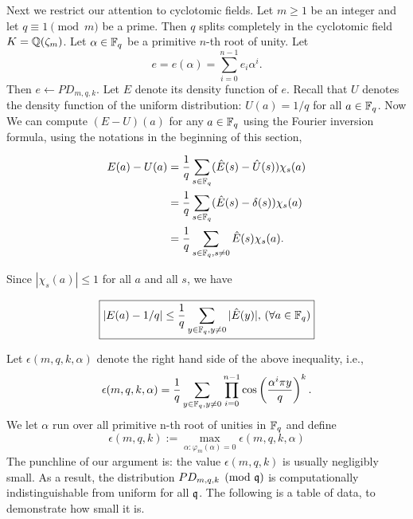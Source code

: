\documentclass{amsart}
\begin{document}
Next we restrict our attention to cyclotomic fields. Let
$m \geq 1$ be an integer and let $q \equiv 1 \pmod{m}$ be a prime. Then $q$ splits completely in the cyclotomic field $K = \mathbb{Q}(\zeta_m)$. Let $\alpha \in \mathbb{F}_q$ be a primitive $n$-th root of unity. Let
\[
    e = e(\alpha) = \sum_{i=0}^{n-1} e_i \alpha^i.
\]
Then $e \gets PD_{m,q,k}$. Let $E$ denote its density function of $e$. Recall that $U$ denotes the density function of the uniform distribution: $U(a) = 1/q$ for all $a \in \mathbb{F}_q$. Now We can compute $(E - U)(a)$ for any $a \in \mathbb{F}_q$ using the Fourier inversion formula, using the notations in the beginning of this section,

\begin{align*}
    E(a) - U(a) &= \frac{1}{q} \sum_{s \in \mathbb{F}_q} (\hat{E}(s) - \hat{U}(s) )\chi_s(a) \\
& = \frac{1}{q} \sum_{s \in \mathbb{F}_q} (\hat{E}(s) - \delta(s) )\chi_s(a) \\
& = \frac{1}{q} \sum_{s \in \mathbb{F}_q, s \neq 0} \hat{E}(s) \chi_s(a).
\end{align*}

Since $|\chi_s(a)| \leq 1$ for all $a$ and all $s$, we have

\begin{Prop}
\[
    \boxed{|E(a) -  1/q| \leq \frac{1}{q}  \sum_{y \in \mathbb{F}_q, y \neq 0}  |\hat{E}(y)|, \, (\forall a \in \mathbb{F}_q)}
\]
\end{Prop}

Let $\epsilon(m,q,k,\alpha)$ denote the right hand side of the above inequality, i.e.,
\[
    \epsilon(m,q,k, \alpha) = \frac{1}{q}\sum_{y \in \mathbb{F}_q, y \neq 0} \prod_{i=0}^{n-1} \cos \left(\frac{ \alpha^i \pi y}{q} \right)^k.
\]
We let $\alpha$ run over all primitive n-th root of unities in $\mathbb{F}_q$ and define
$$\epsilon(m,q,k) := \max_{\alpha: \varphi_m(\alpha) = 0 } \epsilon(m,q,k,\alpha)$$
The punchline of our argument is: the value $\epsilon(m,q,k)$ is usually negligibly small. As a result, the distribution $PD_{m,q,k} \pmod {\mathfrak{q}}$ is computationally indistinguishable from uniform for all $\mathfrak{q}$. The following is a table of data, to demonstrate how small it is.
\end{document}
